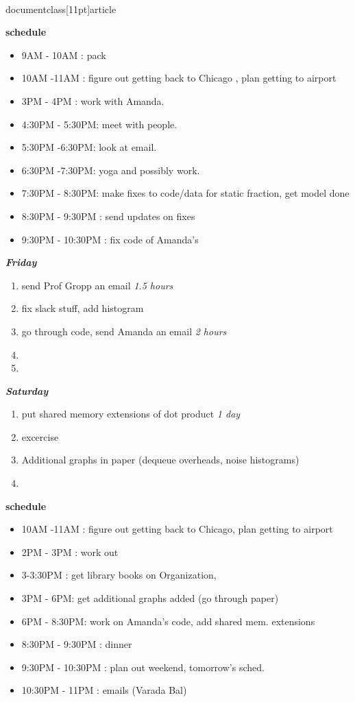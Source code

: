\\documentclass[11pt]{article}
\newcommand{\timeEst}[1]{\textit{#1}}
\begin{document}
\textbf{schedule}
\begin{itemize}
\item 9AM - 10AM :  pack
\item 10AM -11AM : figure out getting back to Chicago ,  plan getting to
airport
\item 3PM - 4PM : work with Amanda.
\item 4:30PM - 5:30PM: meet with people.
\item 5:30PM -6:30PM:  look at email.
\item 6:30PM -7:30PM:  yoga and possibly work.
\item 7:30PM - 8:30PM: make fixes to code/data for static fraction, get model done
\item 8:30PM - 9:30PM : send updates on fixes
\item 9:30PM - 10:30PM : fix code of Amanda's
\end{itemize}
\textbf{\textit{Friday}}
\begin{enumerate}
\item send Prof Gropp an email  \timeEst{1.5 hours}
\item fix slack stuff, add histogram
\item go through code,  send Amanda an email \timeEst{2 hours}
\item
\item
\end{enumerate}

\textbf{\textit{Saturday}}
\begin{enumerate}
\item put shared memory extensions of dot product  \timeEst{1 day}
\item excercise
\item Additional graphs in paper (dequeue overheads, noise histograms)
\item
\end{enumerate}
\newpage
\textbf{schedule}
\begin{itemize}
\item 10AM -11AM : figure out getting back to Chicago, plan getting to airport
\item 2PM - 3PM : work out
\item 3-3:30PM : get library books on Organization,
\item 3PM - 6PM: get additional graphs added (go through paper)
\item 6PM - 8:30PM: work on Amanda's code, add shared mem. extensions
\item 8:30PM - 9:30PM : dinner
\item 9:30PM - 10:30PM : plan out weekend, tomorrow's sched.
\item 10:30PM - 11PM : emails (Varada Bal)
\end{itemize}
\end{document}

